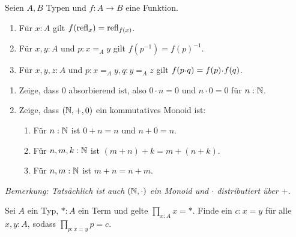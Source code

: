 \documentclass{uebung}
\begin{document}

\begin{exercise}
  Seien $A,B$ Typen und $f:A\to B$ eine Funktion.
  \begin{enumerate}
    \item Für $x:A$ gilt $f(\mathrm{refl}_x)=\mathrm{refl}_{f(x)}$.
    \item Für $x,y:A$ und $p:x=_A y$ gilt $f(p^{-1})=f(p)^{-1}$.
    \item Für $x,y,z:A$ und $p:x=_A y, q:y=_A z$ gilt $f(p\kon q)=f(p)\kon f(q)$.
  \end{enumerate}
\end{exercise}

\begin{exercise}
  \begin{enumerate}
    \item Zeige, dass $0$ absorbierend ist, also $0 \cdot n = 0$ und $n \cdot 0 = 0$ für $n:\mathbb{N}$.
    \item Zeige, dass $(\mathbb{N},+,0)$ ein kommutatives Monoid ist:
      \begin{enumerate}
        \item Für $n:\mathbb{N}$ ist $0 + n = n$ und $n + 0 = n$.
        \item Für $n,m,k:\mathbb{N}$ ist $(m + n) + k = m + (n + k)$.
        \item Für $n,m:\mathbb{N}$ ist $m + n = n + m$.
      \end{enumerate}
    \end{enumerate}
    \emph{Bemerkung: Tatsächlich ist auch $(\mathbb{N},\cdot)$ ein Monoid und $\cdot$ distributiert über $+$.}
\end{exercise}

\begin{exercise}
  Sei $A$ ein Typ, $\ast:A$ ein Term und gelte $\prod_{x:A}x=\ast$.
  Finde ein $c:x=y$ für alle $x,y:A$, sodass $\prod_{p:x=y}p=c$.
\end{exercise}
\end{document}
